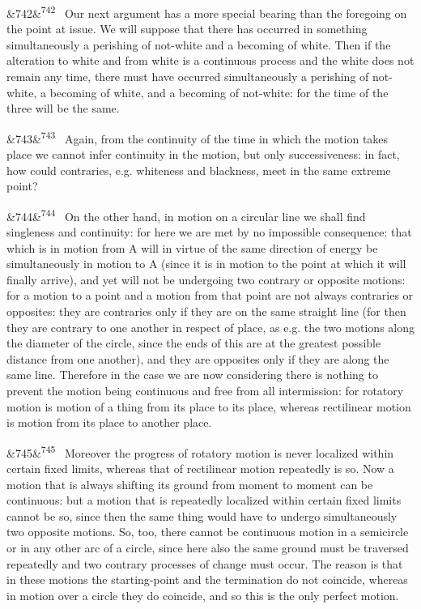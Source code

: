 \documentclass[12pt]{article}
\newcommand{\para}[1][]{\par\noindent\ifx&#1&\else\textsuperscript{\footnotesize #1}~\fi}
\begin{document}
\para[742] Our next argument has a more special bearing than the foregoing on the point at issue. We will suppose that there has occurred in something simultaneously a perishing of not-white and a becoming of white. Then if the alteration to white and from white is a continuous process and the white does not remain any time, there must have occurred simultaneously a perishing of not-white, a becoming of white, and a becoming of not-white: for the time of the three will be the same.

\para[743] Again, from the continuity of the time in which the motion takes place we cannot infer continuity in the motion, but only successiveness: in fact, how could contraries, e.g. whiteness and blackness, meet in the same extreme point?

\para[744] On the other hand, in motion on a circular line we shall find singleness and continuity: for here we are met by no impossible consequence: that which is in motion from A will in virtue of the same direction of energy be simultaneously in motion to A (since it is in motion to the point at which it will finally arrive), and yet will not be undergoing two contrary or opposite motions: for a motion to a point and a motion from that point are not always contraries or opposites: they are contraries only if they are on the same straight line (for then they are contrary to one another in respect of place, as e.g. the two motions along the diameter of the circle, since the ends of this are at the greatest possible distance from one another), and they are opposites only if they are along the same line. Therefore in the case we are now considering there is nothing to prevent the motion being continuous and free from all intermission: for rotatory motion is motion of a thing from its place to its place, whereas rectilinear motion is motion from its place to another place.

\para[745] Moreover the progress of rotatory motion is never localized within certain fixed limits, whereas that of rectilinear motion repeatedly is so. Now a motion that is always shifting its ground from moment to moment can be continuous: but a motion that is repeatedly localized within certain fixed limits cannot be so, since then the same thing would have to undergo simultaneously two opposite motions. So, too, there cannot be continuous motion in a semicircle or in any other arc of a circle, since here also the same ground must be traversed repeatedly and two contrary processes of change must occur. The reason is that in these motions the starting-point and the termination do not coincide, whereas in motion over a circle they do coincide, and so this is the only perfect motion.
\end{document}
